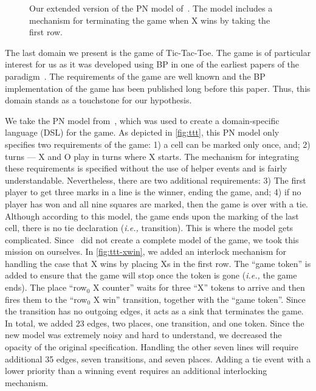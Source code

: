 \documentclass[10pt,journal,compsoc]{IEEEtran}
\theoremstyle{definition}
\newcommand{\ie}{\emph{i.e.,}\xspace}
\begin{document}
\begin{figure*}
\begin{minipage}[b]{0.6\textwidth}
    {}
    \caption{Our extended version of the PN model of~\cite{PetriNetDSLblahchain}. The model includes a mechanism for terminating the game when X wins by taking the first row.}
    \label{fig:ttt-xwin}\vspace{6em}\vspace{-2pt}
\end{minipage}
\end{figure*}

The last domain we present is the game of Tic-Tac-Toe. The game is of particular interest for us as it was developed using BP in one of the earliest papers of the paradigm~\cite{harel2010programming}. The requirements of the game are well known and the BP implementation of the game has been published long before this paper. Thus, this domain stands as a touchstone for our hypothesis.

We take the PN model from~\cite{PetriNetDSLblahchain}, which was used to create a domain-specific language (DSL) for the game. As depicted in \autoref{fig:ttt}, this PN model only specifies two requirements of the game: 1) a cell can be marked only once, and; 2) turns --- X and O play in turns where X starts.
The mechanism for integrating these requirements is specified without the use of helper events and is fairly understandable. Nevertheless, there are two additional requirements: 3) The first player to get three marks in a line is the winner, ending the game, and; 4) if no player has won and all nine squares are marked, then the game is over with a tie. Although according to this model, the game ends upon the marking of the last cell, there is no tie declaration (\ie transition). This is where the model gets complicated. Since~\cite{PetriNetDSLblahchain} did not create a complete model of the game, we took this mission on ourselves. In \autoref{fig:ttt-xwin}, we added an interlock mechanism for handling the case that X wins by placing Xs in the first row. The ``game token'' is added to ensure that the game will stop once the token is gone (\ie the game ends). The place ``row$_0$ X counter'' waits for three ``X'' tokens to arrive and then fires them to the ``row$_0$ X win'' transition, together with the ``game token''. Since the transition has no outgoing edges, it acts as a sink that terminates the game. In total, we added 23 edges, two places, one transition, and one token. Since the new model was extremely noisy and hard to understand, we decreased the opacity of the original specification. Handling the other seven lines will require additional 35 edges, seven transitions, and seven places. Adding a tie event with a lower priority than a winning event requires an additional interlocking mechanism.
\end{document}
